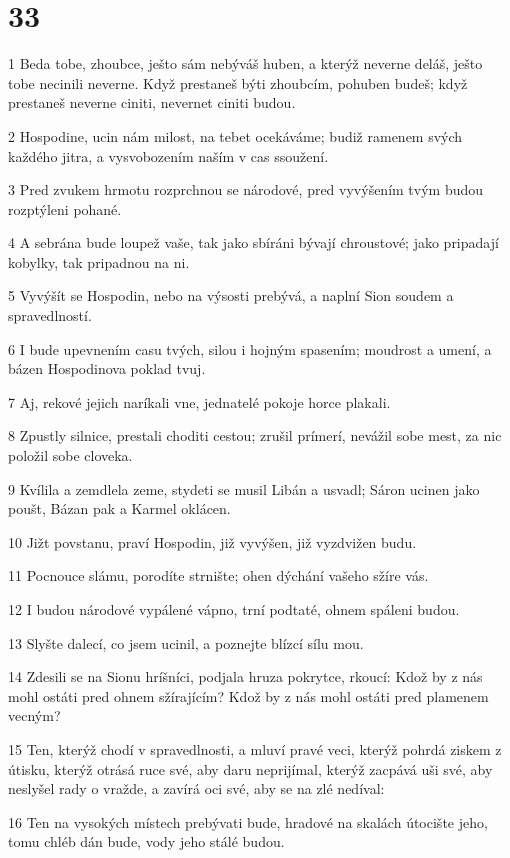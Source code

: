 \chapter{33}

\par 1 Beda tobe, zhoubce, ješto sám nebýváš huben, a kterýž neverne deláš, ješto tobe necinili neverne. Když prestaneš býti zhoubcím, pohuben budeš; když prestaneš neverne ciniti, nevernet ciniti budou.
\par 2 Hospodine, ucin nám milost, na tebet ocekáváme; budiž ramenem svých každého jitra, a vysvobozením naším v cas ssoužení.
\par 3 Pred zvukem hrmotu rozprchnou se národové, pred vyvýšením tvým budou rozptýleni pohané.
\par 4 A sebrána bude loupež vaše, tak jako sbíráni bývají chroustové; jako pripadají kobylky, tak pripadnou na ni.
\par 5 Vyvýšít se Hospodin, nebo na výsosti prebývá, a naplní Sion soudem a spravedlností.
\par 6 I bude upevnením casu tvých, silou i hojným spasením; moudrost a umení, a bázen Hospodinova poklad tvuj.
\par 7 Aj, rekové jejich naríkali vne, jednatelé pokoje horce plakali.
\par 8 Zpustly silnice, prestali choditi cestou; zrušil prímerí, nevážil sobe mest, za nic položil sobe cloveka.
\par 9 Kvílila a zemdlela zeme, stydeti se musil Libán a usvadl; Sáron ucinen jako poušt, Bázan pak a Karmel oklácen.
\par 10 Jižt povstanu, praví Hospodin, již vyvýšen, již vyzdvižen budu.
\par 11 Pocnouce slámu, porodíte strnište; ohen dýchání vašeho sžíre vás.
\par 12 I budou národové vypálené vápno, trní podtaté, ohnem spáleni budou.
\par 13 Slyšte dalecí, co jsem ucinil, a poznejte blízcí sílu mou.
\par 14 Zdesili se na Sionu hríšníci, podjala hruza pokrytce, rkoucí: Kdož by z nás mohl ostáti pred ohnem sžírajícím? Kdož by z nás mohl ostáti pred plamenem vecným?
\par 15 Ten, kterýž chodí v spravedlnosti, a mluví pravé veci, kterýž pohrdá ziskem z útisku, kterýž otrásá ruce své, aby daru neprijímal, kterýž zacpává uši své, aby neslyšel rady o vražde, a zavírá oci své, aby se na zlé nedíval:
\par 16 Ten na vysokých místech prebývati bude, hradové na skalách útocište jeho, tomu chléb dán bude, vody jeho stálé budou.
